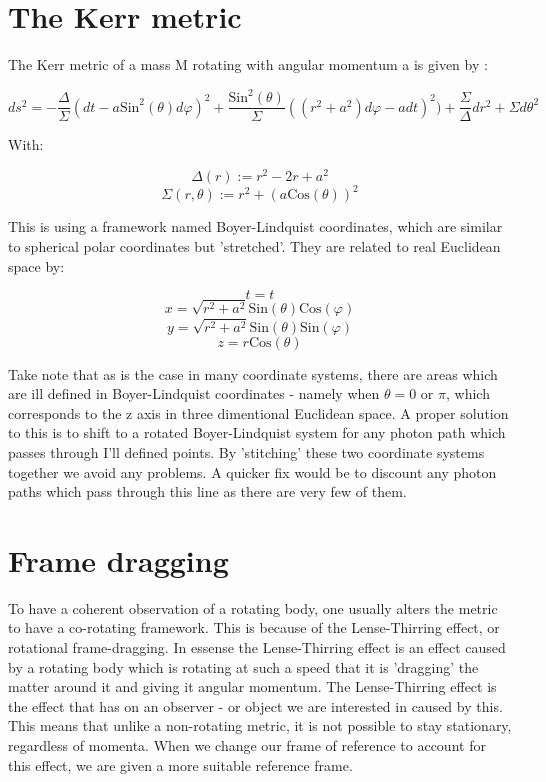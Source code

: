 \documentclass[oneside,openright,frontopenright]{dmathesis}
\begin{document}
\section{The Kerr metric}

	The Kerr metric of a mass M rotating with angular momentum a is given by \cite{raquepas2017topics}:

	\[{ds^{2} = -\frac{\Delta}{\Sigma}(dt-a\mbox{Sin}^2(\theta)d\varphi)^2+\frac{\mbox{Sin}^2(\theta)}{\Sigma}((r^2+a^2)d\varphi-adt)^2)+\frac{\Sigma}{\Delta}dr^2+\Sigma d\theta^2}\]

	With:
	
	\[\Delta(r) := r^2 - 2r + a^2\]
	\[\Sigma(r, \theta) := r^2 +(a\mbox{Cos}(\theta))^2\]

	This is using a framework named Boyer-Lindquist coordinates, which are similar to spherical polar coordinates but 'stretched'. They are related to real Euclidean space by:

	\[t=t\]
	\[x = \sqrt{r^2+a^2}\mbox{Sin}(\theta)\mbox{Cos}(\varphi)\]
	\[y = \sqrt{r^2+a^2}\mbox{Sin}(\theta)\mbox{Sin}(\varphi)\]
	\[z = r\mbox{Cos}(\theta)\]

	Take note that as is the case in many coordinate systems, there are areas which are ill defined in Boyer-Lindquist coordinates - namely when $\theta = 0\mbox{ or }\pi$, which corresponds to the z axis in three dimentional Euclidean space. A proper solution to this is to shift to a rotated Boyer-Lindquist system for any photon path which passes through I'll defined points. By 'stitching' these two coordinate systems together we avoid any problems. A quicker fix would be to discount any photon paths which pass through this line as there are very few of them.

\section{Frame dragging}

	To have a coherent observation of a rotating body, one usually alters the metric to have a co-rotating framework. This is because of the Lense-Thirring effect, or rotational frame-dragging. In essense the Lense-Thirring effect is an effect caused by a rotating body which is rotating at such a speed that it is 'dragging' the matter around it and giving it angular momentum. The Lense-Thirring effect is the effect that has on an observer - or object we are interested in caused by this. This means that unlike a non-rotating metric, it is not possible to stay stationary, regardless of momenta. When we change our frame of reference to account for this effect, we are given a more suitable reference frame.
\end{document}
